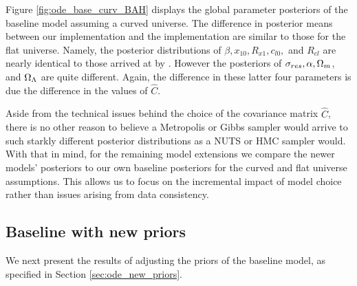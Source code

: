 Figure \ref{fig:ode_base_curv_BAH} displays the global parameter posteriors of the baseline model assuming a curved universe. The difference in posterior means between our implementation and the \citet{Shariff+others:2016} implementation are similar to those for the flat universe. Namely, the posterior distributions of $\beta, x_{10}, R_{x1}, c_{l0},$ and $R_{cl}$ are nearly identical to those arrived at by \citet{Shariff+others:2016}. However the posteriors of $\sigma_{res}, \alpha, \Omega_m$, and $\Omega_\Lambda$ are quite different. Again, the difference in these latter four parameters is due the difference in the values of $\hat{C}$.

Aside from the technical issues behind the choice of the covariance matrix $\hat{C}$, there is no other reason to believe a Metropolis or Gibbs sampler would arrive to such starkly different posterior distributions as a NUTS or HMC sampler would. With that in mind, for the remaining model extensions we compare the newer models' posteriors to our own baseline posteriors for the curved and flat universe assumptions. This allows us to focus on the incremental impact of model choice rather than issues arising from data consistency. 

\subsection{Baseline with new priors}
\label{sec:ode_results_baseline_new_prior}

We next present the results of adjusting the priors of the baseline model, as specified in Section \ref{sec:ode_new_priors}.

